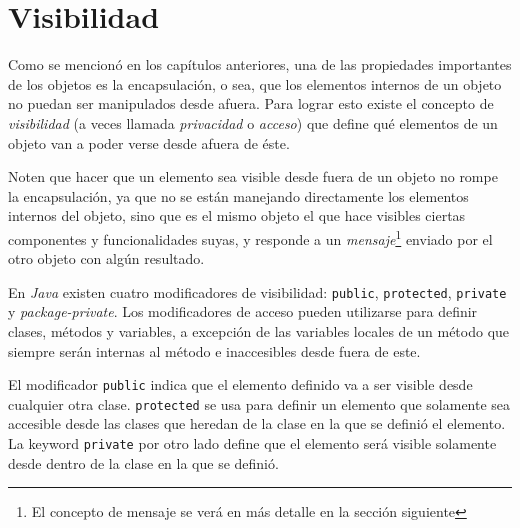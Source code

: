 \section{Visibilidad}
  \label{sec:access-mod}

  Como se mencionó en los capítulos anteriores, una de las propiedades importantes de los objetos es
  la encapsulación, o sea, que los elementos internos de un objeto no puedan ser manipulados desde
  afuera.
  Para lograr esto existe el concepto de \textit{visibilidad} (a veces llamada 
  \textit{privacidad} o \textit{acceso}) que define qué elementos de un objeto van a poder verse 
  desde afuera de éste.

  Noten que hacer que un elemento sea visible desde fuera de un objeto no rompe la encapsulación, ya
  que no se están manejando directamente los elementos internos del objeto, sino que es el mismo 
  objeto el que hace visibles ciertas componentes y funcionalidades suyas, y responde a un 
  \textit{mensaje}\footnote{El concepto de mensaje se verá en más detalle en la sección siguiente} 
  enviado por el otro objeto con algún resultado.

  En \textit{Java} existen cuatro modificadores de visibilidad: \texttt{public}, 
  \texttt{protected}, \texttt{private} y \textit{package-private}.
  Los modificadores de acceso pueden utilizarse para definir clases, métodos y variables, a 
  excepción de las variables locales de un método que siempre serán internas al método e 
  inaccesibles desde fuera de este.

  El modificador \texttt{public} indica que el elemento definido va a ser visible desde 
  cualquier otra clase.
  \texttt{protected} se usa para definir un elemento que solamente sea accesible desde las
  clases que heredan de la clase en la que se definió el elemento.
  La keyword \texttt{private} por otro lado define que el elemento será visible solamente 
  desde dentro de la clase en la que se definió.

